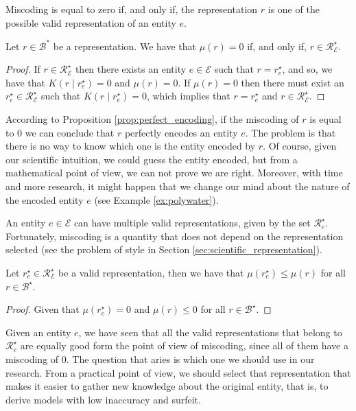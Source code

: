 Miscoding is equal to zero if, and only if, the representation $r$ is one of the possible valid representation of an entity $e$.

\begin{proposition}\label{prop:perfect_encoding}
Let $r \in \mathcal{B}^\ast$ be a representation. We have that $\mu(r) = 0$ if, and only if, $r \in \mathcal{R}^\star_\mathcal{E}$.
\end{proposition}
\begin{proof}
If $r \in \mathcal{R}^\star_\mathcal{E}$ then there exists an entity $e \in \mathcal{E}$ such that $r = r^\star_e$, and so, we have that $K \left( r \mid r^\star_e \right) = 0$ and $\mu(r) = 0$. If $\mu(r) = 0$ then there must exist an $r^\star_e \in \mathcal{R}^\star_\mathcal{E}$ such that $K \left( r \mid r^\star_e \right) = 0$, which implies that $r = r^\star_e$ and $r \in \mathcal{R}^\star_\mathcal{E}$.
\end{proof}

According to Proposition \ref{prop:perfect_encoding}, if the miscoding of $r$ is equal to 0 we can conclude that $r$ perfectly encodes an entity $e$. The problem is that there is no way to know which one is the entity encoded by $r$. Of course, given our scientific intuition, we could guess the entity encoded, but from a mathematical point of view, we can not prove we are right. Moreover, with time and more research, it might happen that we change our mind about the nature of the encoded entity $e$ (see Example \ref{ex:polywater}).

An entity $e \in \mathcal{E}$ can have multiple valid representations, given by the set $\mathcal{R}^\star_e$. Fortunately, miscoding is a quantity that does not depend on the representation selected (see the problem of style in Section \ref{sec:scientific_representation}).

\begin{proposition}
Let $r^\star_e \in \mathcal{R}^\star_\mathcal{E}$ be a valid representation, then we have that $\mu\left( r^\star_e \right) \leq \mu\left( r \right)$ for all $r \in \mathcal{B}^\star$.
\end{proposition}
\begin{proof}
Given that $\mu\left( r^\star_e \right) = 0$ and $\mu\left( r \right) \leq 0$ for all $r \in \mathcal{B}^\star$.
\end{proof}

Given an entity $e$, we have seen that all the valid representations that belong to $\mathcal{R}^\star_e$ are equally good form the point of view of miscoding, since all of them have a miscoding of $0$. The question that aries is which one we should use in our research. From a practical point of view, we should select that representation that makes it easier to gather new knowledge about the original entity, that is, to derive models with low inaccuracy and surfeit.

